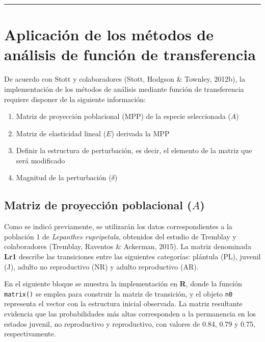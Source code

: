 \documentclass[
  12pt,
  letterpaper,
]{book}
\providecommand{\tightlist}{%
  \setlength{\itemsep}{0pt}\setlength{\parskip}{0pt}}\usepackage{longtable,booktabs,array}
\begin{document}
\begin{center}\rule{0.5\linewidth}{0.5pt}\end{center}

\section{Aplicación de los métodos de análisis de función de
transferencia}\label{aplicaciuxf3n-de-los-muxe9todos-de-anuxe1lisis-de-funciuxf3n-de-transferencia}

De acuerdo con Stott y colaboradores (Stott, Hodgson \& Townley, 2012b),
la implementación de los métodos de análisis mediante función de
transferencia requiere disponer de la siguiente información:

\begin{enumerate}
\def\labelenumi{\alph{enumi})}
\tightlist
\item
  Matriz de proyección poblacional (MPP) de la especie seleccionada
  (\(A\))
\item
  Matriz de elasticidad lineal (\(E\)) derivada la MPP
\item
  Definir la estructura de perturbación, es decir, el elemento de la
  matriz que será modificado
\item
  Magnitud de la perturbación (\(\delta\))
\end{enumerate}

\subsection{\texorpdfstring{Matriz de proyección poblacional
(\(A\))}{Matriz de proyección poblacional (A)}}\label{matriz-de-proyecciuxf3n-poblacional-a}

Como se indicó previamente, se utilizarán los datos correspondientes a
la población 1 de \emph{Lepanthes rupripetala}, obtenidos del estudio de
Tremblay y colaboradores (Tremblay, Raventos \& Ackerman, 2015). La
matriz denominada \textbf{Lr1} describe las transiciones entre las
siguientes categorías: plántula (PL), juvenil (J), adulto no
reproductivo (NR) y adulto reproductivo (AR).

En el siguiente bloque se muestra la implementación en \textbf{R}, donde
la función \texttt{matrix()} se emplea para construir la matriz de
transición, y el objeto \texttt{n0} representa el vector con la
estructura inicial observada. La matriz resultante evidencia que las
probabilidades más altas corresponden a la permanencia en los estados
juvenil, no reproductivo y reproductivo, con valores de 0.84, 0.79 y
0.75, respectivamente.
\end{document}
